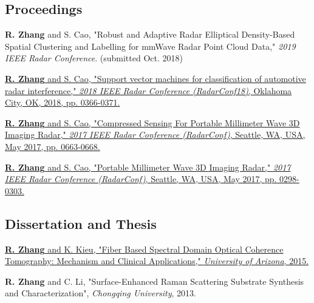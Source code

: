 \documentclass[letterpaper,9pt]{article}
\renewenvironment{itemize}{
  \begin{list}{}{
    \setlength{\topsep}{0pt}
    \setlength{\itemsep}{0pt}
    \setlength{\parsep}{0pt}
    \setlength{\partopsep}{0pt}
    \setlength{\leftmargin}{1.5em}
  }
}{\end{list}}
\begin{document}
\subsection*{Proceedings}

\begin{itemize}
  \item {\bf R. Zhang} and S. Cao, "Robust and Adaptive Radar Elliptical Density-Based Spatial Clustering and Labelling for mmWave Radar Point Cloud Data," {\it 2019 IEEE Radar Conference}. (submitted Oct. 2018)
  \item \href{https://ieeexplore.ieee.org/abstract/document/8378586/}{{\bf R. Zhang} and S. Cao, "Support vector machines for classification of automotive radar interference," {\it 2018 IEEE Radar Conference (RadarConf18)}, Oklahoma City, OK, 2018, pp. 0366-0371.}
  \item \href{http://ieeexplore.ieee.org/document/7944286/}{{\bf R. Zhang} and S. Cao, "Compressed Sensing For Portable Millimeter Wave 3D Imaging Radar," {\it 2017 IEEE Radar Conference (RadarConf)}, Seattle, WA, USA, May 2017, pp. 0663-0668.}
  \item \href{http://ieeexplore.ieee.org/abstract/document/7944216/}{{\bf R. Zhang} and S. Cao, "Portable Millimeter Wave 3D Imaging Radar," {\it 2017 IEEE Radar Conference (RadarConf)}, Seattle, WA, USA, May 2017, pp. 0298-0303.}
\end{itemize}

\subsection*{Dissertation and Thesis}

\begin{itemize}
  \item \href{https://scholar.google.com/citations?view_op=view_citation&hl=en&user=PpPf3BoAAAAJ&citation_for_view=PpPf3BoAAAAJ:9yKSN-GCB0IC}{{\bf R. Zhang} and K. Kieu, "Fiber Based Spectral Domain Optical Coherence Tomography: Mechanism and Clinical Applications," {\it University of Arizona}, 2015.}

  \item {\bf R. Zhang} and C. Li, "Surface-Enhanced Raman Scattering Substrate Synthesis and Characterization", {\it Chongqing University}, 2013.
\end{itemize}
\end{document}
